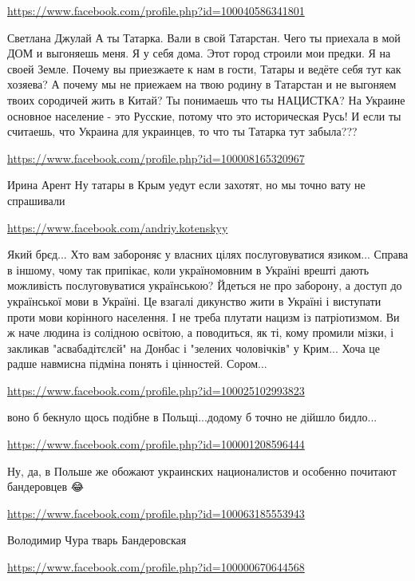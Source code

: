 \documentclass[a4paper,11pt]{extreport}
\begin{document}
\begin{itemize}
\begin{itemize}
\url{https://www.facebook.com/profile.php?id=100040586341801}

Светлана Джулай А ты Татарка. Вали в свой Татарстан. Чего ты приехала в мой ДОМ и выгоняешь меня. Я у себя дома. Этот город строили мои предки. Я на своей Земле. Почему вы приезжаете к нам в гости, Татары и ведёте себя тут как хозяева? А почему мы не приежаем на твою родину в Татарстан и не выгоняем твоих сородичей жить в Китай? Ты понимаешь что ты НАЦИСТКА? На Украине основное население - это Русские, потому что это историческая Русь! И если ты считаешь, что Украина для украинцев, то что ты Татарка тут забыла???

\url{https://www.facebook.com/profile.php?id=100008165320967}

Ирина Арент Ну татары в Крым уедут если захотят, но мы точно вату не спрашивали

\end{itemize}
\url{https://www.facebook.com/andriy.kotenskyy}

Який брєд... Хто вам забороняє у власних цілях послуговуватися язиком... Справа в іншому, чому так припікає, коли україномовним в Україні врешті дають можливість послуговуватися українською? Йдеться не про заборону, а доступ до української мови в Україні. Це взагалі дикунство жити в Україні і виступати проти мови корінного населення. І не треба плутати нацизм із патріотизмом. Ви ж наче людина із солідною освітою, а поводиться, як ті, кому промили мізки, і закликав "асвабадітєлєй" на Донбас і "зелених чоловічків" у Крим... Хоча це радше навмисна підміна понять і цінностей. Сором...

\url{https://www.facebook.com/profile.php?id=100025102993823}

воно б бекнуло щось подібне в Польщі...додому б точно не дійшло бидло...

\begin{itemize}
\url{https://www.facebook.com/profile.php?id=100001208596444}

Ну, да, в Польше же обожают украинских националистов и особенно почитают бандеровцев 😂🤣

\url{https://www.facebook.com/profile.php?id=100063185553943}

Володимир Чура тварь Бандеровская

\end{itemize}
\url{https://www.facebook.com/profile.php?id=100000670644568}


\end{itemize}
\end{document}
